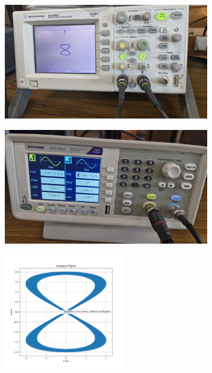 \documentclass[a4paper,12pt]{article}
\begin{document}
\begin{figure}[H]
    \centering
    \begin{subfigure}{\textwidth}
        \centering
        \includegraphics[height=5cm]{figures/4/plot.jpg}
    \end{subfigure}%
    \begin{subfigure}{\textwidth}
        \centering
        \includegraphics[height=5cm]{figures/4/para.jpg}
    \end{subfigure}
    \begin{subfigure}{\textwidth}
        \centering
        \includegraphics[height=5cm]{figures/4/Figure_4.png}
    \end{subfigure}%
\end{figure}
\end{document}
